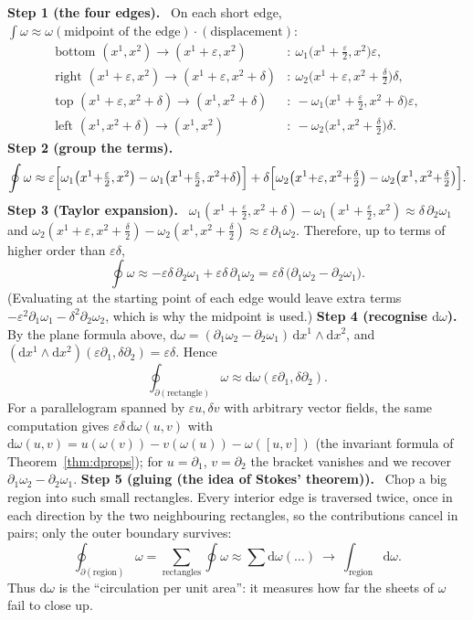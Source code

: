 \documentclass[11pt,a4paper]{article}
\newcounter{thm}[section]
\numberwithin{equation}{section}
\theoremstyle{definition}
\theoremstyle{plain}
\newcommand{\Step}[2]{\textbf{Step #1 (#2).}\ }
\newcommand{\dd}{\mathrm{d}}
\begin{document}
\Step{1}{the four edges} On each short edge, $\int\omega\approx\omega(\text{midpoint of the edge})\cdot(\text{displacement})$:
\begin{align*}
\text{bottom }(x^1,x^2)\to(x^1{+}\varepsilon,x^2)&:\ \omega_1\bigl(x^1{+}\tfrac\varepsilon2,x^2\bigr)\varepsilon,\\
\text{right }(x^1{+}\varepsilon,x^2)\to(x^1{+}\varepsilon,x^2{+}\delta)&:\ \omega_2\bigl(x^1{+}\varepsilon,x^2{+}\tfrac\delta2\bigr)\delta,\\
\text{top }(x^1{+}\varepsilon,x^2{+}\delta)\to(x^1,x^2{+}\delta)&:\ -\omega_1\bigl(x^1{+}\tfrac\varepsilon2,x^2{+}\delta\bigr)\varepsilon,\\
\text{left }(x^1,x^2{+}\delta)\to(x^1,x^2)&:\ -\omega_2\bigl(x^1,x^2{+}\tfrac\delta2\bigr)\delta.
\end{align*}
\Step{2}{group the terms}
\[
\oint\omega\approx\varepsilon\Bigl[\omega_1\bigl(x^1{+}\tfrac\varepsilon2,x^2\bigr)-\omega_1\bigl(x^1{+}\tfrac\varepsilon2,x^2{+}\delta\bigr)\Bigr]+\delta\Bigl[\omega_2\bigl(x^1{+}\varepsilon,x^2{+}\tfrac\delta2\bigr)-\omega_2\bigl(x^1,x^2{+}\tfrac\delta2\bigr)\Bigr].
\]
\Step{3}{Taylor expansion} $\omega_1(x^1{+}\frac\varepsilon2,x^2{+}\delta)-\omega_1(x^1{+}\frac\varepsilon2,x^2)\approx\delta\,\partial_2\omega_1$ and $\omega_2(x^1{+}\varepsilon,x^2{+}\frac\delta2)-\omega_2(x^1,x^2{+}\frac\delta2)\approx\varepsilon\,\partial_1\omega_2$. Therefore, up to terms of higher order than $\varepsilon\delta$,
\[
\oint\omega\approx-\varepsilon\delta\,\partial_2\omega_1+\varepsilon\delta\,\partial_1\omega_2=\varepsilon\delta\,\bigl(\partial_1\omega_2-\partial_2\omega_1\bigr).
\]
(Evaluating at the starting point of each edge would leave extra terms $-\varepsilon^2\partial_1\omega_1-\delta^2\partial_2\omega_2$, which is why the midpoint is used.)
\Step{4}{recognise $\dd\omega$} By the plane formula above, $\dd\omega=(\partial_1\omega_2-\partial_2\omega_1)\,\dd x^1\wedge\dd x^2$, and $(\dd x^1\wedge\dd x^2)(\varepsilon\partial_1,\delta\partial_2)=\varepsilon\delta$. Hence
\begin{equation}\label{eq:circ}
\oint_{\partial(\text{rectangle})}\omega\approx\dd\omega(\varepsilon\partial_1,\delta\partial_2).
\end{equation}
For a parallelogram spanned by $\varepsilon u,\delta v$ with arbitrary vector fields, the same computation gives $\varepsilon\delta\,\dd\omega(u,v)$ with $\dd\omega(u,v)=u(\omega(v))-v(\omega(u))-\omega([u,v])$ (the invariant formula of Theorem~\ref{thm:dprops}); for $u=\partial_1$, $v=\partial_2$ the bracket vanishes and we recover $\partial_1\omega_2-\partial_2\omega_1$.
\Step{5}{gluing (the idea of Stokes' theorem)} Chop a big region into such small rectangles. Every interior edge is traversed twice, once in each direction by the two neighbouring rectangles, so the contributions cancel in pairs; only the outer boundary survives:
\[
\oint_{\partial(\text{region})}\omega=\sum_{\text{rectangles}}\oint\omega\approx\sum\dd\omega(\dots)\ \longrightarrow\ \int_{\text{region}}\dd\omega .
\]
Thus $\dd\omega$ is the ``circulation per unit area'': it measures how far the sheets of $\omega$ fail to close up.
\end{document}
